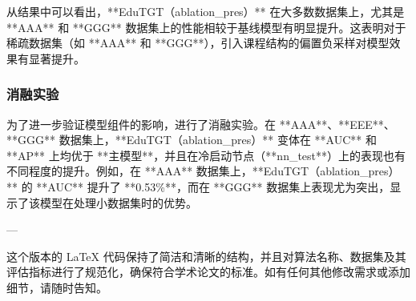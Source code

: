从结果中可以看出，**EduTGT（ablation\_pres）** 在大多数数据集上，尤其是 **AAA** 和 **GGG** 数据集上的性能相较于基线模型有明显提升。这表明对于稀疏数据集（如 **AAA** 和 **GGG**），引入课程结构的偏置负采样对模型效果有显著提升。

\subsubsection{消融实验}

为了进一步验证模型组件的影响，进行了消融实验。在 **AAA**、**EEE**、**GGG** 数据集上，**EduTGT（ablation\_pres）** 变体在 **AUC** 和 **AP** 上均优于 **主模型**，并且在冷启动节点（**nn\_test**）上的表现也有不同程度的提升。例如，在 **AAA** 数据集上，**EduTGT（ablation\_pres）** 的 **AUC** 提升了 **0.53\%**，而在 **GGG** 数据集上表现尤为突出，显示了该模型在处理小数据集时的优势。

---

这个版本的 LaTeX 代码保持了简洁和清晰的结构，并且对算法名称、数据集及其评估指标进行了规范化，确保符合学术论文的标准。如有任何其他修改需求或添加细节，请随时告知。